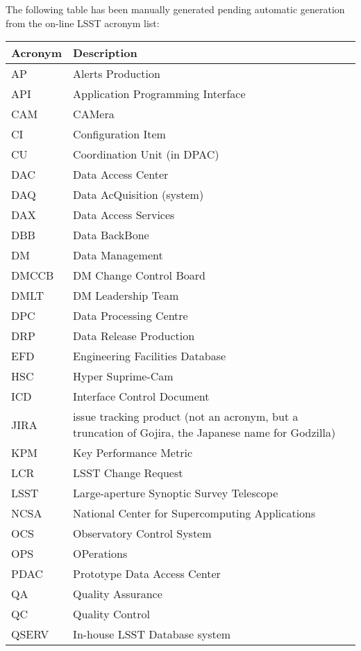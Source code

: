 The following table has been manually generated pending automatic generation from the on-line LSST acronym list:
\newline\newline%
\addtocounter{table}{-1}
\begin{longtable}{|l|p{}|}\hline 
\textbf{Acronym} & \textbf{Description}  \\\hline
AP&Alerts Production \\\hline
API&Application Programming Interface \\\hline
CAM&CAMera \\\hline
CI&Configuration Item \\\hline
CU&Coordination Unit (in DPAC) \\\hline
DAC&Data Access Center \\\hline
DAQ&Data AcQuisition (system) \\\hline
DAX&Data Access Services \\\hline
DBB&Data BackBone \\\hline
DM&Data Management \\\hline
DMCCB&DM Change Control Board \\\hline
DMLT&DM Leadership Team \\\hline
DPC&Data Processing Centre \\\hline
DRP&Data Release Production \\\hline
EFD&Engineering Facilities Database \\\hline
HSC&Hyper Suprime-Cam \\\hline
ICD&Interface Control Document \\\hline
JIRA&issue tracking product (not an acronym, but a truncation of Gojira, the Japanese name for Godzilla) \\\hline
KPM&Key Performance Metric \\\hline
LCR&LSST Change Request \\\hline
LSST&Large-aperture Synoptic Survey Telescope \\\hline
NCSA&National Center for Supercomputing Applications \\\hline
OCS&Observatory Control System \\\hline
OPS&OPerations \\\hline
PDAC&Prototype Data Access Center \\\hline
QA&Quality Assurance \\\hline
QC&Quality Control \\\hline
QSERV&In-house LSST Database system \\\hline

\end{longtable}

